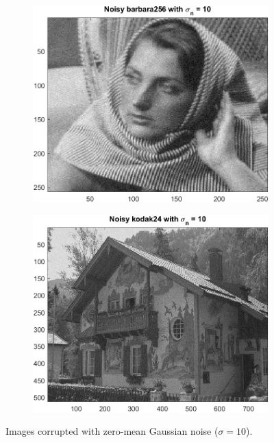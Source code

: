 \documentclass{article}
\begin{document}
\begin{figure}[H]
    \centering
    \begin{subfigure}[b]{0.45\textwidth}
        \includegraphics[width=\textwidth]{../images/barbara_10.png}
    \end{subfigure}
    \begin{subfigure}[b]{0.45\textwidth}
        \includegraphics[width=\textwidth]{../images/kodak_10.png}
    \end{subfigure}
    \caption{Images corrupted with zero-mean Gaussian noise ($\sigma = 10$).}
\end{figure}
\end{document}
